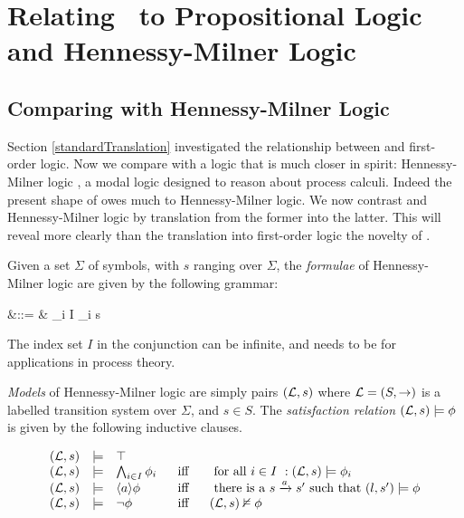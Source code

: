 
\section{Relating \cathoristic\ to Propositional Logic and Hennessy-Milner Logic}\label{relatingELToOtherLogics}

\subsection{Comparing \Cathoristic{} with Hennessy-Milner Logic}

Section \ref{standardTranslation} investigated the relationship
between \cathoristic{} and first-order logic. Now we compare \cathoristic{} with a
logic that is much closer in spirit: Hennessy-Milner logic
\cite{HennessyM:alglawfndac}, a modal logic designed to reason about
process calculi. Indeed the present shape of \cathoristic{} owes much to
Hennessy-Milner logic. We now contrast \cathoristic{} and Hennessy-Milner
logic by translation from the former into the latter.  This will
reveal more clearly than the translation into first-order logic the
novelty of \cathoristic{}.

Given a set $\Sigma$ of symbols, with $s$ ranging over
$\Sigma$, the \emph{formulae} of Hennessy-Milner logic are given
by the following grammar:
\begin{GRAMMAR}
  \phi 
     &\quad ::= \quad & 
  \top \fOr \BIGAND_{i \in I} \phi_i  \fOr \langle s \rangle \phi \fOr \neg \phi 
\end{GRAMMAR}

\NI The index set $I$ in the conjunction can be infinite, and needs to
be for applications in process theory.

 \emph{Models} of Hennessy-Milner logic are simply pairs $(\mathcal{L}, s)$
 where $\mathcal{L} = (S, \rightarrow)$ is a labelled transition system over
 $\Sigma$, and $s \in S$.  The \emph{satisfaction relation} $(\mathcal{L}, s)
 \models \phi$ is given by the following inductive clauses.

\[
\begin{array}{lclcl}
  (\mathcal{L}, s) 
     & \models & 
  \top  \\
  (\mathcal{L}, s) 
     & \models & 
  \bigwedge_{i \in I} \phi_i  &\  \mbox{ iff }\  & \mbox { for all $i \in I$ }: (\mathcal{L}, s) \models \phi_i  \\
  (\mathcal{L}, s) 
     & \models & 
  \langle a \rangle \phi & \mbox{ iff } & \mbox{ there is a } s \xrightarrow{a} s' \mbox { such that } (l,s') \models \phi  \\
  (\mathcal{L}, s) 
     & \models & 
  \neg \phi & \mbox{ iff } & (\mathcal{L}, s)  \nvDash \phi 
\end{array}
\]


